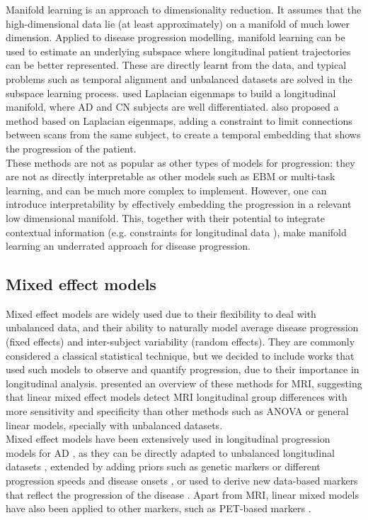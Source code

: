 Manifold learning is an approach to dimensionality reduction. It assumes that the high-dimensional data lie (at least approximately) on a manifold of much lower dimension. Applied to disease progression modelling, manifold learning can be used to estimate an underlying subspace where longitudinal patient trajectories can be better represented. These are directly learnt from the data, and typical problems such as temporal alignment and unbalanced datasets are solved in the subspace learning process. \cite{Wolz2010} used Laplacian eigenmaps to build a longitudinal manifold, where AD and CN subjects are well differentiated. \cite{Guerrero2015,guerrero} also proposed a method based on Laplacian eigenmaps, adding a constraint to limit connections between scans from the same subject, to create a temporal embedding that shows the progression of the patient. \\

These methods are not as popular as other types of models for progression: they are not as directly interpretable as other models such as EBM or multi-task learning, and can be much more complex to implement. However, one can introduce interpretability by effectively embedding the progression in a relevant low dimensional manifold. This, together with their potential to integrate contextual information (e.g. constraints for longitudinal data \cite{Guerrero2015}), make manifold learning an underrated approach for disease progression.

\subsection{Mixed effect models}

Mixed effect models are widely used due to their flexibility to deal with unbalanced data, and their ability to naturally model average disease progression (fixed effects) and inter-subject variability (random effects). They are commonly considered a classical statistical technique, but we decided to include works that used such models to observe and quantify progression, due to their importance in longitudinal analysis. \cite{Bernal-Rusiel2013} presented an overview of these methods for MRI, suggesting that linear mixed effect models detect MRI longitudinal group differences with more sensitivity and specificity than other methods such as ANOVA or general linear models, specially with unbalanced datasets. \\

Mixed effect models have been extensively used in longitudinal progression models for AD \cite{Bilgel2015a,Bilgel2016,Davatzikos2009,Koval2018,miriad,Platero2019,Schiratti2015,Villemagne2013,Ziegler2015b}, as they can be directly adapted to unbalanced longitudinal datasets \cite{Koval2018}, extended by adding priors such as genetic markers \cite{Ziegler2015b} or different progression speeds and disease onsets \cite{Schiratti2015}, or used to derive new data-based markers that reflect the progression of the disease \cite{Bilgel2015a,Bilgel2016,Davatzikos2009,Platero2019}. Apart from MRI, linear mixed models have also been applied to other markers, such as PET-based markers \cite{Bilgel2016,Dodge2014}. \\

